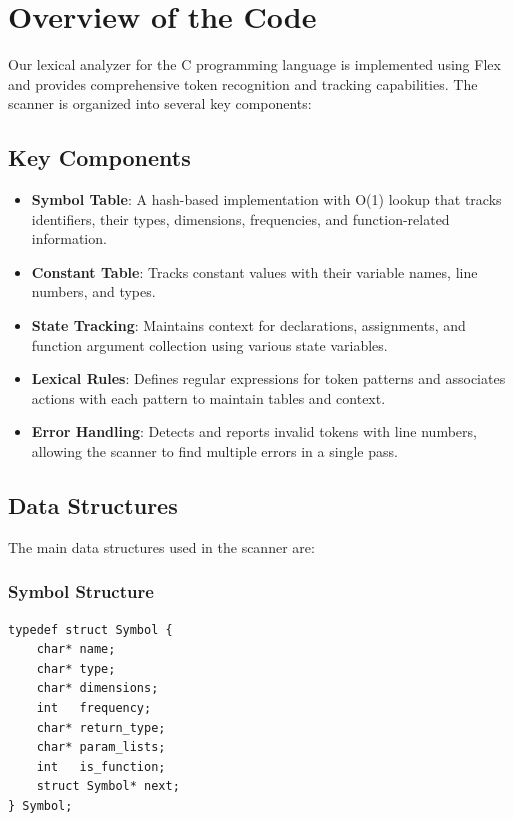 \documentclass[12pt]{article}
\begin{document}
\section{Overview of the Code}

Our lexical analyzer for the C programming language is implemented using Flex and provides comprehensive token recognition and tracking capabilities. The scanner is organized into several key components:

\subsection{Key Components}
\begin{itemize}
    \item \textbf{Symbol Table}: A hash-based implementation with O(1) lookup that tracks identifiers, their types, dimensions, frequencies, and function-related information.
    
    \item \textbf{Constant Table}: Tracks constant values with their variable names, line numbers, and types.
    
    \item \textbf{State Tracking}: Maintains context for declarations, assignments, and function argument collection using various state variables.
    
    \item \textbf{Lexical Rules}: Defines regular expressions for token patterns and associates actions with each pattern to maintain tables and context.
    
    \item \textbf{Error Handling}: Detects and reports invalid tokens with line numbers, allowing the scanner to find multiple errors in a single pass.
\end{itemize}

\subsection{Data Structures}
The main data structures used in the scanner are:

\subsubsection{Symbol Structure}
\begin{verbatim}
typedef struct Symbol {
    char* name;
    char* type;         
    char* dimensions;   
    int   frequency;    
    char* return_type;  
    char* param_lists;  
    int   is_function;  
    struct Symbol* next;
} Symbol;
\end{verbatim}
\end{document}
